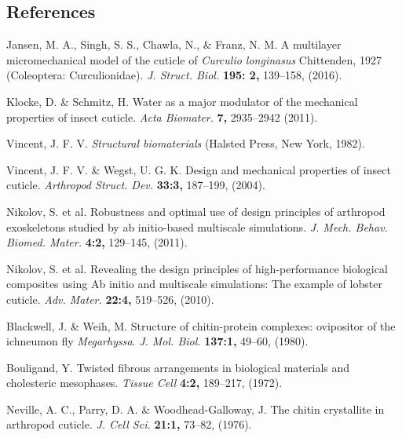 \documentclass[twocolumn, linenumbers, superscriptaddress]{revtex4-1}
\begin{document}
	\begin{thebibliography}{50}
		\section*{References}
				Jansen, M. A., Singh, S. S., Chawla, N., \& Franz, N. M.
				A multilayer micromechanical model of the cuticle of \textit{Curculio longinasus} Chittenden, 1927 (Coleoptera: Curculionidae).
				\textit{J. Struct. Biol.}
				\textbf{195: 2,}
				139--158,
				(2016).
				
				Klocke, D. \& Schmitz, H.
				Water as a major modulator of the mechanical properties of insect cuticle.
				\textit{Acta Biomater.}
				\textbf{7,}
				2935--2942
				(2011).
				
				Vincent, J. F. V.
				\textit{Structural biomaterials}
				(Halsted Press,
				New York,
				1982).
				
				Vincent, J. F. V. \& Wegst, U. G. K.
				Design and mechanical properties of insect cuticle.				
				\textit{Arthropod Struct. Dev.}
				\textbf{33:3,}
				187--199,
				(2004).
				
				Nikolov, S. et al.
				Robustness and optimal use of design principles of arthropod exoskeletons studied by ab initio-based multiscale simulations.
				\textit{J. Mech. Behav. Biomed. Mater.}
				\textbf{4:2,}
				129--145,
				(2011).
				
				Nikolov, S. et al.
				Revealing the design principles of high-performance biological composites using Ab initio and multiscale simulations: The example of lobster cuticle.
				\textit{Adv. Mater.}
				\textbf{22:4,}
				519--526,
				(2010).
				
				Blackwell, J. \& Weih, M.
				Structure of chitin-protein complexes: ovipositor of the ichneumon fly \textit{Megarhyssa}.
				\textit{J. Mol. Biol.}
				\textbf{137:1,}
				49--60,
				(1980).

				Bouligand, Y.
				Twisted fibrous arrangements in biological materials and cholesteric mesophases.
				\textit{Tissue Cell}
				\textbf{4:2,}
				189--217,
				(1972).
				
				Neville, A. C., Parry, D. A. \& Woodhead-Galloway, J.
				The chitin crystallite in arthropod cuticle.
				\textit{J. Cell Sci.}
				\textbf{21:1,}
				73--82,
				(1976).
				

\end{thebibliography}
\end{document}
